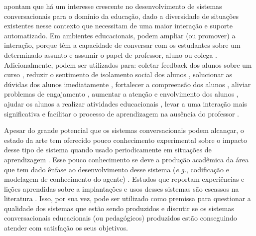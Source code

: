  apontam que há um interesse crescente no desenvolvimento de sistemas conversacionais para o domínio da educação, dado a diversidade de situações existentes nesse contexto que necessitam de uma maior interação e suporte automatizado. %
Em ambientes educacionais, podem ampliar (ou promover) a interação, porque têm a capacidade de conversar com os estudantes sobre um determinado assunto e assumir o papel de professor, aluno ou colega \cite{Moreno:2016}. Adicionalmente, podem ser utilizados para: coletar feedback dos alunos sobre %
um curso %
\cite{Wambsganss:2020}, %
reduzir o sentimento de isolamento social dos alunos \cite{krassmann2018}, %
solucionar as dúvidas dos alunos imediatamente \cite{Moraes:2019}, fortalecer a compreensão dos alunos %
\cite{Winkler:2020}, aliviar problemas de engajamento  \cite{Winkler:2020}, aumentar a atenção e envolvimento dos alunos \cite{Moraes:2019}, ajudar os alunos a realizar atividades educacionais \cite{Winkler:2020}, levar a uma interação mais significativa \cite{Winkler:2020} e facilitar o processo de aprendizagem na ausência do professor \cite{Tegos:2020}.

Apesar do grande potencial que os sistemas conversacionais podem alcançar, o estado da arte tem oferecido pouco conhecimento experimental sobre o impacto desse tipo de sistema quando usado periodicamente em situações de aprendizagem \cite{paschoalframework}. Esse pouco conhecimento se deve a produção acadêmica da área que tem dado ênfase ao desenvolvimento desse sistema (\textit{e.g.}, codificação e modelagem de conhecimento do agente) \cite{io2017, bernardini2018, kuyven2018, roos2018}. Estudos que reportam experiências e lições aprendidas sobre a implantações e usos desses sistemas são escassos na literatura \cite{paschoalframework}. Isso, por sua vez, pode ser utilizado como premissa para questionar a qualidade dos sistemas que estão sendo produzidos e discutir se os sistemas conversacionais educacionais (ou pedagógicos) produzidos estão conseguindo atender com satisfação os seus objetivos.

